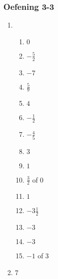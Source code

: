 {\begin{multicols}{3}
  \subsubsection*{Oefening 3-3} %
  \begin{enumerate}[label=\textbf{\arabic*}.,itemsep=1pt]
  \item %
    \begin{enumerate}[label=\textbf{(\alph*)}, itemsep=1pt]
    \item $0$%
    \item $-\frac{5}{2}$%
    \item $-7$%
    \item $\frac{5}{9}$%
    \item $4$%
    \item $-\frac{1}{2}$%
    \item $-\frac{4}{5}$%
    \item $3$%
    \item $1$%
    \item $\frac{3}{2}$ of $0$%
    \item $1$%
\item $-3\frac{1}{2}$ %
\item $-3$ %
\item $-3$ %
\item $-1$ of $3$ %
    \end{enumerate}
  \item $7$%
  \end{enumerate}


\end{multicols}}

